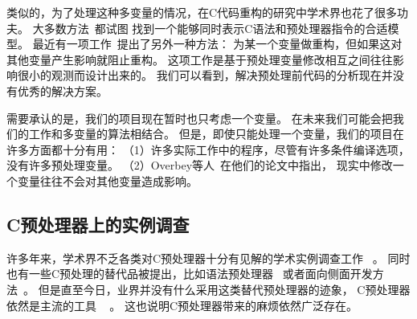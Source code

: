 类似的，为了处理这种多变量的情况，在C代码重构的研究中学术界也花了很多功夫。
大多数方法~\parencite{Garrido2002,Vittek2003,Spinellis2003,Garrido2013}都试图
找到一个能够同时表示C语法和预处理器指令的合适模型。
最近有一项工作~\parencite{Overbey2014}提出了另外一种方法：
为某一个变量做重构，但如果这对其他变量产生影响就阻止重构。
这项工作是基于预处理变量修改相互之间往往影响很小的观测而设计出来的。
我们可以看到，解决预处理前代码的分析现在并没有优秀的解决方案。

需要承认的是，我们的项目现在暂时也只考虑一个变量。
在未来我们可能会把我们的工作和多变量的算法相结合。
但是，即使只能处理一个变量，我们的项目在许多方面都十分有用：
（1）许多实际工作中的程序，尽管有许多条件编译选项，没有许多预处理变量。
（2）Overbey等人~\parencite{Overbey2014}在他们的论文中指出，
现实中修改一个变量往往不会对其他变量造成影响。




%
%

\subsection{C预处理器上的实例调查}
许多年来，学术界不乏各类对C预处理器十分有见解的学术实例调查工作
~\parencite{Spencer92,ernst2002empirical,Liebig2011}。
同时也有一些C预处理的替代品被提出，比如语法预处理器~\parencite{Weise1993,McCloskey:2005}
或者面向侧面开发方法~\parencite{Lohmann2006,Adams2009,Boucher2010}。
但是直至今日，业界并没有什么采用这类替代预处理器的迹象，
C预处理器依然是主流的工具 ~\cite{Medeiros2015} 。
这也说明C预处理器带来的麻烦依然广泛存在。



